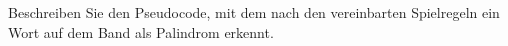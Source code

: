 Beschreiben Sie den Pseudocode, mit dem nach den vereinbarten
Spielregeln ein Wort auf dem Band als Palindrom erkennt.

\begin{loesung}
\end{loesung}



